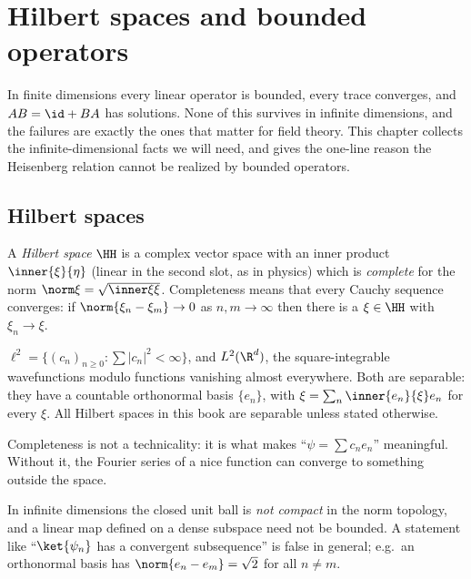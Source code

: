 \chapter{Hilbert spaces and bounded operators}\label{ch:hilbert}

\begin{physmotiv}
In finite dimensions every linear operator is bounded, every trace converges, and $AB=\id+BA$ has solutions. None of this survives in infinite dimensions, and the failures are exactly the ones that matter for field theory. This chapter collects the infinite-dimensional facts we will need, and gives the one-line reason the Heisenberg relation cannot be realized by bounded operators.
\end{physmotiv}

\section{Hilbert spaces}

A \emph{Hilbert space} $\HH$ is a complex vector space with an inner product $\inner{\xi}{\eta}$ (linear in the second slot, as in physics) which is \emph{complete} for the norm $\norm\xi=\sqrt{\inner\xi\xi}$. Completeness means that every Cauchy sequence converges: if $\norm{\xi_n-\xi_m}\to0$ as $n,m\to\infty$ then there is a $\xi\in\HH$ with $\xi_n\to\xi$.

\begin{example}
$\ell^2=\{(c_n)_{n\ge0}:\sum|c_n|^2<\infty\}$, and $L^2(\R^d)$, the square-integrable wavefunctions modulo functions vanishing almost everywhere. Both are separable: they have a countable orthonormal basis $\{e_n\}$, with $\xi=\sum_n\inner{e_n}{\xi}e_n$ for every $\xi$. All Hilbert spaces in this book are separable unless stated otherwise.
\end{example}

Completeness is not a technicality: it is what makes ``$\psi=\sum c_ne_n$'' meaningful. Without it, the Fourier series of a nice function can converge to something outside the space.

\begin{whatwrong}
In infinite dimensions the closed unit ball is \emph{not compact} in the norm topology, and a linear map defined on a dense subspace need not be bounded. A statement like ``$\ket{\psi_n}$ has a convergent subsequence'' is false in general; e.g.\ an orthonormal basis has $\norm{e_n-e_m}=\sqrt2$ for all $n\ne m$.
\end{whatwrong}

